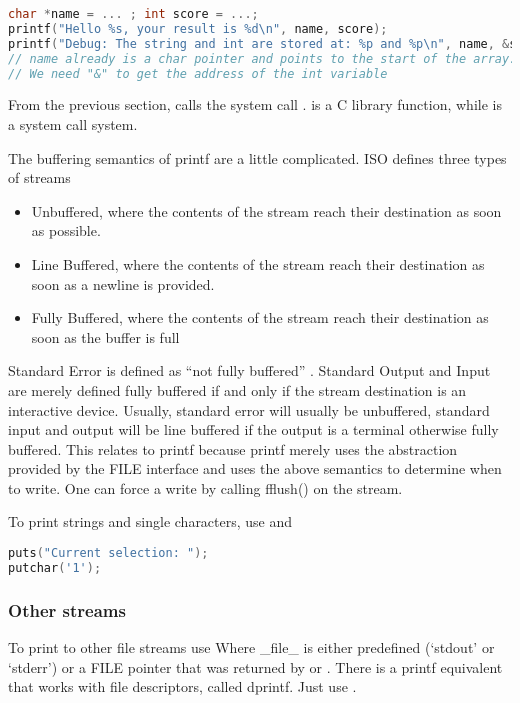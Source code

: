 \begin{lstlisting}[language=C]
char *name = ... ; int score = ...;
printf("Hello %s, your result is %d\n", name, score);
printf("Debug: The string and int are stored at: %p and %p\n", name, &score );
// name already is a char pointer and points to the start of the array.
// We need "&" to get the address of the int variable
\end{lstlisting}

From the previous section,
 calls the system call .
 is a C library function, while  is a system call system.

The buffering semantics of printf are a little complicated.
ISO defines three types of streams \cite[P. 278]{ISON1124}
\begin{itemize}
\item Unbuffered, where the contents of the stream reach their destination as soon as possible.
\item Line Buffered, where the contents of the stream reach their destination as soon as a newline is provided.
\item Fully Buffered, where the contents of the stream reach their destination as soon as the buffer is full
\end{itemize}

Standard Error is defined as ``not fully buffered'' \cite[P. 279]{ISON1124}.
Standard Output and Input are merely defined fully buffered if and only if the stream destination is an interactive device.
Usually, standard error will usually be unbuffered, standard input and output will be line buffered if the output is a terminal otherwise fully buffered.
This relates to printf because printf merely uses the abstraction provided by the FILE interface and uses the above semantics to determine when to write.
One can force a write by calling fflush() on the stream.

To print strings and single characters, use  and 

\begin{lstlisting}[language=C]
puts("Current selection: ");
putchar('1');
\end{lstlisting}

\subsubsection{Other streams}

To print to other file streams use  Where \_file\_ is either predefined (`stdout' or `stderr') or a FILE pointer that was returned by  or .
There is a printf equivalent that works with file descriptors, called dprintf.
Just use .

